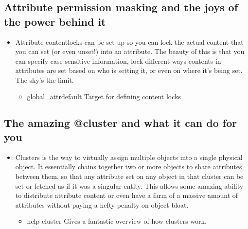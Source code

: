 \documentclass[letterpaper,10pt,english]{sphinxmanual}
\begin{document}
\subsection{Attribute permission masking and the joys of the power behind it}
\label{\detokenize{features:attribute-permission-masking-and-the-joys-of-the-power-behind-it}}\begin{itemize}
\item {} 
\sphinxAtStartPar
Attribute contentlocks can be set up so you can lock the actual
content that you can set (or even unset!) into an attribute.
The beauty of this is that you can specify case sensitive
information, lock different ways contents in attributes are set
based on who is setting it, or even on where it’s being set.
The sky’s the limit.
\begin{itemize}
\item {} 
\sphinxAtStartPar
global\_attrdefault    \sphinxhyphen{} Target for defining content locks

\end{itemize}

\end{itemize}


\subsection{The amazing @cluster and what it can do for you}
\label{\detokenize{features:the-amazing-cluster-and-what-it-can-do-for-you}}\begin{itemize}
\item {} 
\sphinxAtStartPar
Clusters is the way to virtually assign multiple objects into
a single physical object.  It essentially chains together two
or more objects to share attributes between them, so that any
attribute set on any object in that cluster can be set or fetched
as if it was a singular entity.  This allows some amazing ability
to distribute attribute content or even have a farm of a massive
amount of attributes without paying a hefty penalty on object bloat.
\begin{itemize}
\item {} 
\sphinxAtStartPar
help cluster  \textendash{} Gives a fantastic overview of how clusters work.

\end{itemize}

\end{itemize}
\end{document}
